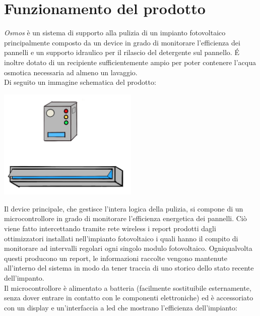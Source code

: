 \documentclass[a4paper, 12pt]{article}
\begin{document}
	\section{Funzionamento del prodotto}
	\emph{Osmos} è un sistema di supporto alla pulizia di un impianto fotovoltaico principalmente composto da un device in grado di monitorare l'efficienza dei pannelli 
	e un supporto idraulico per il rilascio del detergente sul pannello. \'E inoltre dotato di un recipiente sufficientemente ampio per poter contenere l'acqua osmotica necessaria ad almeno un lavaggio.\\Di seguito un immagine schematica del prodotto:
	\begin{center}
		\includegraphics[width=0.5\textwidth]{Images/prototipo.jpg}
	\end{center}
	Il device principale, che gestisce l'intera logica della pulizia, si compone di un microcontrollore in grado di monitorare l'efficienza energetica dei pannelli. Ciò viene fatto intercettando tramite rete wireless i report prodotti dagli ottimizzatori installati nell'impianto fotovoltaico i quali hanno il compito di monitorare ad intervalli regolari ogni singolo modulo fotovoltaico. Ogniqualvolta questi producono un report, le informazioni raccolte vengono mantenute all'interno del sistema in modo da tener traccia di uno storico dello stato recente dell'impanto.\\
	Il microcontrollore è alimentato a batteria (facilmente sostituibile esternamente, senza dover entrare in contatto con le componenti elettroniche) ed è accessoriato con un display e un'interfaccia a led che mostrano l'efficienza dell'impianto:
\end{document}
